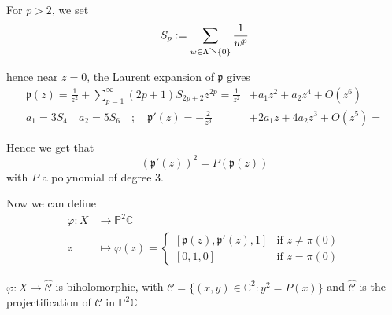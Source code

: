\begin{note}[ation]
    For \(p > 2\), we set
    \[
      S_p := \sum_{w \in \Lambda \sminus \{0\} } \frac{1}{w^{p}}
    \]
\end{note}

hence near \(z=0\), the Laurent expansion of \(\mathfrak{p}\) gives
\begin{align*}
    \mathfrak{p}{(z)} = \frac{1}{z^2} + \sum_{p=1}^{\infty} {(2p+1)}S_{2p+2} z^{2p}
  = \frac{1}{z^2} &+ a_{1}z^2 + a_{2}z^{4} + O{(z^{6})} \\
  a_{1} = 3S_{4} \quad a_{2} = 5S_{6} \quad;\quad
    \mathfrak{p}'{(z)} = -\frac{2}{z^3} &+ 2a_{1} z + 4a_{2} z^3 + O{(z^5)} =
\end{align*}

Hence we get that 
\begin{equation}{}\label{eq:pol_pp}
    {(\mathfrak{p}'{(z)})}^2 = P {(\mathfrak{p}{(z)})}
\end{equation}
with \(P\) a polynomial of degree 3.

Now we can define
\begin{align*}
    \varphi : X &\longrightarrow \mathbb{P}^2 \mathbb{C} \\
    z &\longmapsto \varphi (z) = \begin{cases}{}
        [\mathfrak{p}{(z)}, \mathfrak{p}'{(z)}, 1] & \text{if } z \neq \pi
        {(0)}\\
        [0, 1, 0] & \text{if } z = \pi {(0)}
    \end{cases}
\end{align*}

\begin{theorem}{}
    \(\varphi : X \to \widehat{\mathcal{C}}\) is biholomorphic, with
    \(\mathcal{C} = \{ {(x,y)} \in \mathbb{C}^2 : y^2 = P{(x)}\}  \) and
    \(\widehat{\mathcal{C}}\) is the projectification of \(\mathcal{C}\) in
    \(\mathbb{P}^2 \mathbb{C}\) 
\end{theorem}

